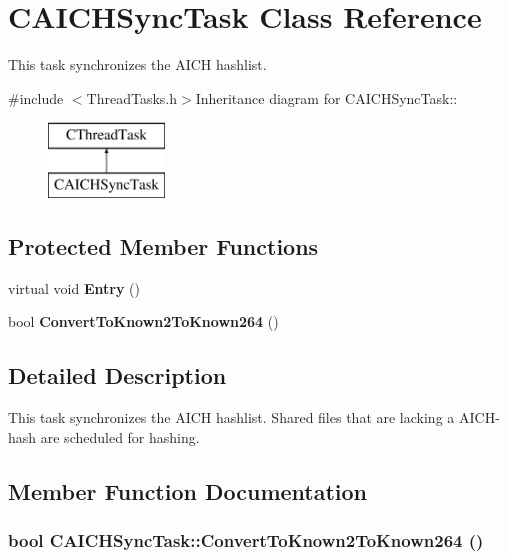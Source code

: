 \section{CAICHSyncTask Class Reference}
\label{classCAICHSyncTask}


This task synchronizes the AICH hashlist.  


{\ttfamily \#include $<$ThreadTasks.h$>$}Inheritance diagram for CAICHSyncTask::\begin{figure}[H]
\begin{center}
\leavevmode
\includegraphics[height=2cm]{classCAICHSyncTask}
\end{center}
\end{figure}
\subsection*{Protected Member Functions}
\begin{DoxyCompactItemize}
\item 
virtual void {\bf Entry} ()\label{classCAICHSyncTask_a38afe2abf7b4911a886a90ccef0d3c85}

\item 
bool {\bf ConvertToKnown2ToKnown264} ()
\end{DoxyCompactItemize}


\subsection{Detailed Description}
This task synchronizes the AICH hashlist. Shared files that are lacking a AICH-\/hash are scheduled for hashing. 

\subsection{Member Function Documentation}
\subsubsection[{ConvertToKnown2ToKnown264}]{\setlength{\rightskip}{0pt plus 5cm}bool CAICHSyncTask::ConvertToKnown2ToKnown264 ()\hspace{0.3cm}{\ttfamily  [protected]}}\label{classCAICHSyncTask_a65db98819236f5d731833ec3ef8a8ee7}


